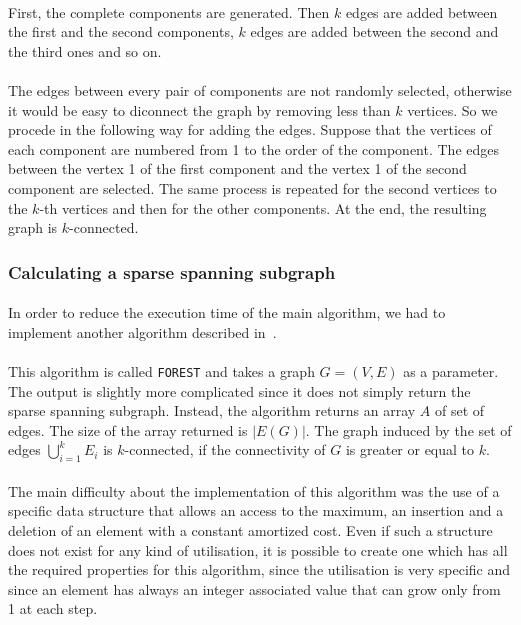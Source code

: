 \paragraph{}
First, the complete components are generated. Then $k$ edges are added between the 
first and the second components, $k$ edges are added between the second and the 
third ones and so on.

\paragraph{}
The edges between every pair of components are not randomly selected, otherwise
it would be easy to diconnect the graph by removing less than $k$ vertices. So
we procede in the following way for adding the edges. Suppose that the
vertices of each component are numbered from 1 to the order of the component.
The edges between the vertex 1 of the first component and the vertex 1 of the
second component are selected. The same process is repeated for the second
vertices to the $k$-th vertices and then  for the other components. At the end,
the resulting graph is $k$-connected.


 
\subsubsection{Calculating a sparse spanning subgraph}
\paragraph{}
In order to reduce the execution time of the main algorithm, we had to
implement another algorithm described in~\cite{NaIb92}.

\paragraph{}
This algorithm is called \verb!FOREST! and takes a graph $G=(V,E)$ as a parameter.
The output is slightly more complicated since it does not simply return the
sparse spanning subgraph. Instead, the algorithm returns an array $A$ of set of
edges. The size of the array returned is $|E(G)|$. The graph induced by the
set of edges $\bigcup \limits_{i=1}^k E_i$
is $k$-connected, if the connectivity of $G$ is greater or equal to $k$.

\paragraph{}
The main difficulty about the implementation of this algorithm was the use of a
specific data structure that allows an access to the maximum, an insertion and
a deletion of an element with a constant amortized cost. Even if such a
structure does not exist for any kind of utilisation, it is possible to create
one which has all the required properties for this algorithm, since the
utilisation is very specific and since an element has always an integer
associated value that can grow only from 1 at each step.

